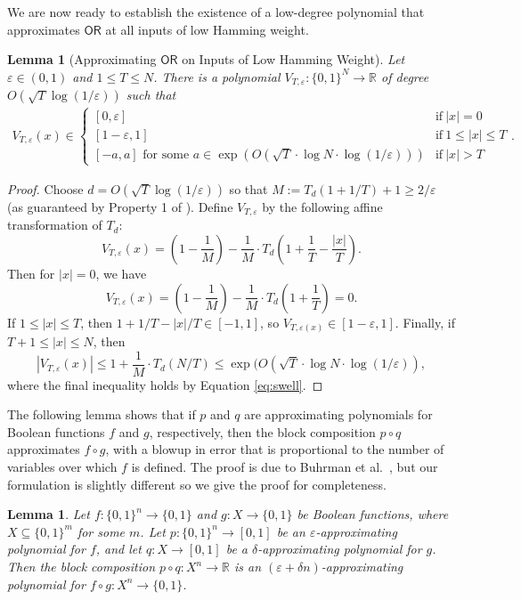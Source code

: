 \documentclass[11pt, letterpaper, fleqn]{article}
\newtheorem{lemma}[theorem]{Lemma}
\theoremstyle{plain}
\newcommand{\R}{\mathbb{R}}
\newcommand{\OR}{\mathsf{ OR}}
\newcommand{\B}{\{0,1\}}
\newcommand{\eps}{\varepsilon}
\begin{document}
We are now ready to establish
the existence of a low-degree polynomial that approximates $\OR$ at all inputs of low Hamming weight.

\begin{lemma}[Approximating $\OR$ on Inputs of Low Hamming Weight]\label{lem:orT}
Let $\eps \in (0, 1)$ and $1 \le T \le N$. There is a polynomial $V_{T, \eps}:\B^N\to \R$ of degree $O(\sqrt{T}\log (1/\eps))$ such that
\begin{align}
V_{T, \eps}(x) \in \begin{cases} [0,\eps] &\mathrm{if}~ |x| = 0 \\
[1-\eps,1] & \mathrm{if}~ 1\leq |x| \leq T \\ 
[-a, a] \text{ for some } a \in {\exp\left(O\left(\sqrt{T} \cdot \log N \cdot \log\left(1/\eps\right)\right)\right)} & \mathrm{if}~ |x| > T \end{cases}.
\end{align}
\end{lemma}
\begin{proof}
Choose $d = O(\sqrt{T} \log(1/\eps))$ so that $M := T_d(1 + 1/T) + 1\ge 2/\eps$ (as guaranteed by Property 1 of ). Define $V_{T, \eps}$ by the following affine transformation of $T_d$:
\[V_{T, \eps}(x) = \left(1  - \frac{1}{M}\right) - \frac{1}{M} \cdot T_d\left(1 + \frac{1}{T} - \frac{|x|}{T}\right).\]
 Then for $|x| = 0$, we have 
\[V_{T, \eps}(x) =  \left(1  - \frac{1}{M}\right) - \frac{1}{M} \cdot T_d\left(1 + \frac{1}{T}\right) = 0.\]
If $1 \le |x| \le T$, then $1 + 1/T - |x| / T \in [-1, 1]$, so $V_{T, \eps(x)} \in [1-\eps, 1]$. Finally, if $T +1 \le |x| \le N$, then
\[|V_{T, \eps}(x)| \le 1 + \frac{1}{M} \cdot T_d(N / T) \le \exp(O(\sqrt{T} \cdot\log N \cdot\log(1/\eps)),\]
where the final inequality holds by Equation \eqref{eq:swell}.
\end{proof}

The following lemma shows that if $p$ and $q$ are approximating polynomials for Boolean functions $f$ and $g$, respectively, then the block composition $p \circ q$ approximates $f \circ g$, with a blowup in error that is proportional to the number of variables over which $f$ is defined. The proof is due to Buhrman et al.~\cite{BuhrmanNRW07}, but our formulation is slightly different so we give the proof for completeness.

\begin{lemma} \label{lem:naive}
Let $f : \B^n \to \B$ and $g : X \to \B$ be Boolean functions, where $X \subseteq \{0, 1\}^m$ for some $m$. Let $p : \B^n \to [0, 1]$ be an $\eps$-approximating polynomial for $f$, and let $q : X \to [0, 1]$ be a $\delta$-approximating polynomial for $g$. Then the block composition $p \circ q : X^n \to \R$ is an $(\eps + \delta n)$-approximating polynomial for $f \circ g : X^n \to \B$.
\end{lemma}
\end{document}
